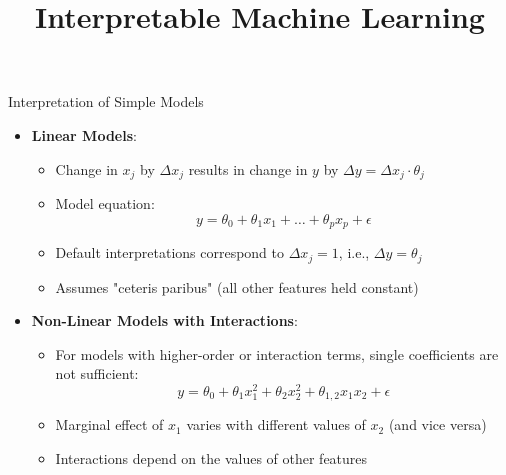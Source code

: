 \documentclass[11pt,compress,t,notes=noshow, aspectratio=169, xcolor=table]{beamer}
\title{Interpretable Machine Learning}
\date{}
\begin{document}
\newcommand{\titlefigure}{figure_man/me_movement}
\newcommand{\learninggoals}{
\item Why parameter-based interpretations are not always possible for parametric models
\item How marginal effects can be used in such cases
\item Drawbacks of marginal effects
\item Model-agnostic applicability}



\begin{frame}{Interpretation of Simple Models}
\begin{itemize}
\item \textbf{Linear Models}:
\begin{itemize}
\item Change in $x_j$ by $\Delta x_j$ results in change in $y$ by $\Delta y = \Delta x_j \cdot \theta_j$
\item Model equation:
\[
y = \theta_0 + \theta_1 x_1 + \dots + \theta_p x_p + \epsilon
\]
\item Default interpretations correspond to $\Delta x_j = 1$, i.e., $\Delta y = \theta_j$
\item Assumes "ceteris paribus" (all other features held constant)
\end{itemize}
\pause
\item \textbf{Non-Linear Models with Interactions}:
\begin{itemize}
\item For models with higher-order or interaction terms, single coefficients are not sufficient:
\[
y = \theta_0 + \theta_{1} x_1^2 + \theta_{2} x_2^2 + \theta_{1,2} x_1 x_2 + \epsilon
\]
\item Marginal effect of $x_1$ varies with different values of $x_2$ (and vice versa)
\item Interactions depend on the values of other features
\end{itemize}
\end{itemize}
\end{frame}

\end{document}
